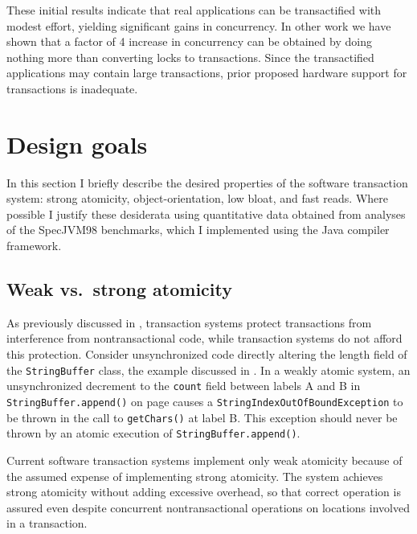 \vspace*{5mm}

These initial results indicate that real applications can be
transactified with modest effort, yielding significant gains in
concurrency.  In other work \cite{AnanianAsKuLeLi05} we have shown
that a factor of 4 increase in concurrency can be obtained
by doing nothing more than converting locks to transactions.  Since
the transactified applications may contain large transactions, prior
proposed hardware support for transactions is inadequate.


\section{Design goals}\label{sec:efficient}

In this section I briefly describe the desired properties of the
\apex software transaction system: strong atomicity,
object-orientation, low bloat, and fast reads.  Where possible I
justify these desiderata using quantitative data obtained from
analyses of the SpecJVM98 benchmarks, which I implemented using the
\flex Java compiler framework.

\subsection{Weak vs.\ strong atomicity}
As previously discussed in ,
transaction systems protect transactions from interference from
nontransactional code, while  transaction
systems do not afford this protection.
Consider unsynchronized code directly altering the length field of
the {\tt String\-Buffer} class, the example discussed in .
In a weakly atomic system, an unsynchronized decrement to the \texttt{count}
field between labels A and B in \texttt{StringBuffer.append()} on
page \pageref{pg:stringbuffer} causes a
\texttt{String\-Index\-Out\-Of\-Bound\-Exception} to be thrown in the call to
\texttt{getChars()} at label B\@.  This exception should never be thrown
by an atomic execution of {\tt String\-Buffer.append()}.

Current software transaction systems implement
only weak atomicity because of the assumed expense of implementing
strong atomicity.  The \apex system
achieves strong atomicity without adding excessive overhead, so that
correct operation is assured even despite concurrent nontransactional
operations on locations involved in a transaction.

